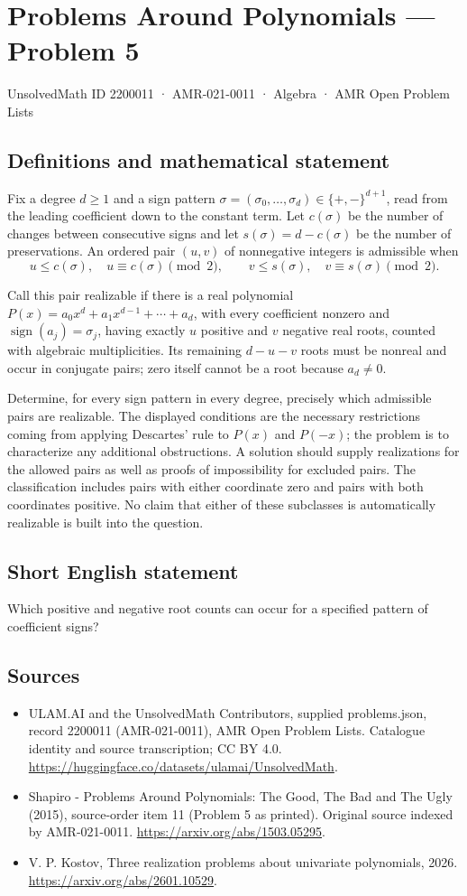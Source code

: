 \documentclass[11pt,a4paper]{article}
\begin{document}
\section*{Problems Around Polynomials — Problem 5}\label{2200011}
{\small UnsolvedMath ID 2200011 · AMR-021-0011 · Algebra · AMR Open Problem Lists}
\subsection{Definitions and mathematical statement}
Fix a degree $d\geq1$ and a sign pattern
$\sigma=(\sigma_0,\ldots,\sigma_d)\in\{+,-\}^{d+1}$, read from the
leading coefficient down to the constant term. Let $c(\sigma)$ be
the number of changes between consecutive signs and let
$s(\sigma)=d-c(\sigma)$ be the number of preservations.
An ordered pair $(u,v)$ of nonnegative integers is admissible when
\[
 u\leq c(\sigma),\quad u\equiv c(\sigma)\pmod2,\qquad
 v\leq s(\sigma),\quad v\equiv s(\sigma)\pmod2.
\]

Call this pair realizable if there is a real polynomial
$P(x)=a_0x^d+a_1x^{d-1}+\cdots+a_d$, with every coefficient nonzero
and $\operatorname{sign}(a_j)=\sigma_j$, having exactly $u$ positive
and $v$ negative real roots, counted with algebraic multiplicities.
Its remaining $d-u-v$ roots must be nonreal and occur in conjugate
pairs; zero itself cannot be a root because $a_d\ne0$.

Determine, for every sign pattern in every degree, precisely which
admissible pairs are realizable. The displayed conditions are the
necessary restrictions coming from applying Descartes' rule to
$P(x)$ and $P(-x)$; the problem is to characterize any additional
obstructions. A solution should supply realizations for the allowed
pairs as well as proofs of impossibility for excluded pairs.
The classification includes pairs with either coordinate zero and
pairs with both coordinates positive. No claim that either of
these subclasses is automatically realizable is built into the question.
\subsection{Short English statement}
Which positive and negative root counts can occur for a specified pattern of coefficient signs?
\subsection{Sources}
\begin{itemize}
\item[S1] ULAM.AI and the UnsolvedMath Contributors, supplied problems.json, record 2200011 (AMR-021-0011), AMR Open Problem Lists. Catalogue identity and source transcription; CC BY 4.0.
\url{https://huggingface.co/datasets/ulamai/UnsolvedMath}.
\item[S2] Shapiro - Problems Around Polynomials: The Good, The Bad and The Ugly (2015), source-order item 11 (Problem 5 as printed). Original source indexed by AMR-021-0011.
\url{https://arxiv.org/abs/1503.05295}.
\item[S3] V. P. Kostov, Three realization problems about univariate polynomials, 2026.
\url{https://arxiv.org/abs/2601.10529}.
\end{itemize}
\end{document}
